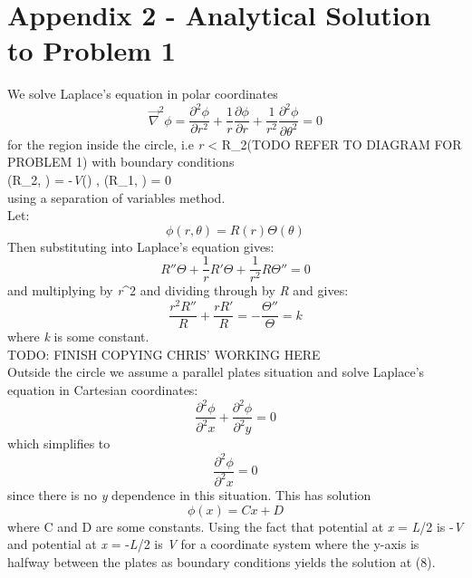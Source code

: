 \documentclass{article}
\begin{document}
\section{Appendix 2 - Analytical Solution to Problem 1}
We solve Laplace's equation in polar coordinates
\begin{equation}
\vec{\nabla}^2\phi = \frac{\partial^2\phi}{\partial r^2}+\frac{1}{r}\frac{\partial\phi}{\partial r}+\frac{1}{r^2} \frac{\partial^2\phi}{\partial\theta^2}=0
\label{6}
\end{equation}
for the region inside the circle, i.e \textit{r} < R_2\)(TODO REFER TO DIAGRAM FOR PROBLEM 1) with boundary conditions  \\ \phi(R_2, \theta) = -\textit{V}\cos(\theta)\)  \:  \: \:,\: \: \:       \phi(R_1, \theta) = 0\)  \\using a separation of variables method. \\ 
Let: 
\begin{equation}
\phi(r, \theta) = R(r)\Theta(\theta)
\end{equation}
Then substituting into Laplace's equation gives:
\begin{equation}
R''\Theta + \frac{1}{r}R'\Theta + \frac{1}{r^2}R\Theta'' = 0 
\end{equation}
and multiplying by \textit{r}^2\) and dividing through by \textit{R} and \Theta\) gives:
\begin{equation}
\frac{r^2R''}{R} + \frac{rR'}{R} = -\frac{\Theta''}{\Theta} = k
\end{equation}
where \textit{k} is some constant. \\
TODO: FINISH COPYING CHRIS' WORKING HERE \\
Outside the circle we assume a parallel plates situation and solve Laplace's equation in Cartesian coordinates:
\begin{equation}
 \frac{\partial^2\phi}{\partial^2x} +\frac{\partial^2\phi}{\partial^2y} =0
\label{6}
\end{equation} 
which simplifies to 
\begin{equation}
\frac{\partial^2\phi}{\partial^2x}  =0
\end{equation} since there is no \textit{y} dependence in this situation. This has solution
\begin{equation}
\phi(x) = Cx + D
\end{equation}
where C and D are some constants. Using the fact that potential at \textit{x} = \textit{L}/2 is -\textit{V} and potential at  \textit{x} = -\textit{L}/2  is \textit{V} for a coordinate system where the y-axis is halfway between the plates as boundary conditions yields the solution at (8).
\end{document}
